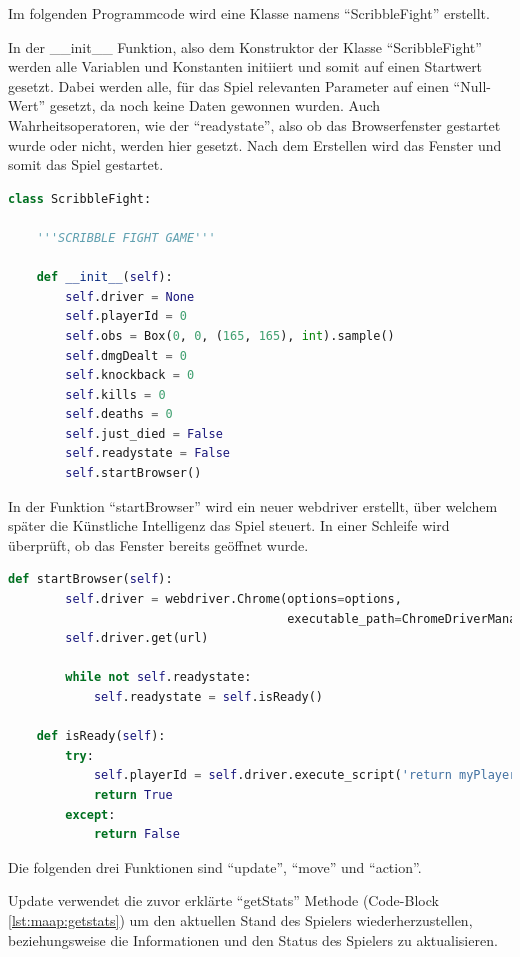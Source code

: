 Im folgenden Programmcode wird eine Klasse namens ``ScribbleFight'' erstellt.

In der \_\_init\_\_ Funktion, also dem Konstruktor der Klasse ``ScribbleFight'' werden alle Variablen und Konstanten initiiert und somit auf einen Startwert gesetzt. Dabei werden alle, für das Spiel relevanten Parameter auf einen ``Null-Wert'' gesetzt, da noch keine Daten gewonnen wurden. Auch Wahrheitsoperatoren, wie der ``readystate'', also ob das Browserfenster gestartet wurde oder nicht, werden hier gesetzt. Nach dem Erstellen wird das Fenster und somit das Spiel gestartet.

\begin{lstlisting}[language=Python,firstnumber=25]
class ScribbleFight:

    '''SCRIBBLE FIGHT GAME'''

    def __init__(self):
        self.driver = None
        self.playerId = 0
        self.obs = Box(0, 0, (165, 165), int).sample()
        self.dmgDealt = 0
        self.knockback = 0
        self.kills = 0
        self.deaths = 0
        self.just_died = False
        self.readystate = False
        self.startBrowser()
\end{lstlisting}

In der Funktion ``startBrowser'' wird ein neuer webdriver erstellt, über welchem später die Künstliche Intelligenz das Spiel steuert.
In einer Schleife wird überprüft, ob das Fenster bereits geöffnet wurde.

\begin{lstlisting}[language=Python,firstnumber=41]
    def startBrowser(self):
        self.driver = webdriver.Chrome(options=options,
                                       executable_path=ChromeDriverManager().install())
        self.driver.get(url)

        while not self.readystate:
            self.readystate = self.isReady()

    def isReady(self):
        try:
            self.playerId = self.driver.execute_script('return myPlayer.id;')
            return True
        except:
            return False
\end{lstlisting}

Die folgenden drei Funktionen sind ``update'', ``move'' und ``action''.

Update verwendet die zuvor erklärte ``getStats'' Methode (Code-Block \ref{lst:maap:getstats}) um den aktuellen Stand des Spielers wiederherzustellen, beziehungsweise die Informationen und den Status des Spielers zu aktualisieren.

